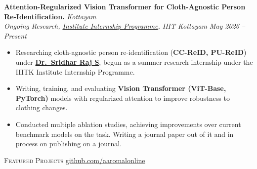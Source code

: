 \documentclass[a4paper]{article}
\newcommand{\lineunder} {
    \vspace*{-8pt} \\
    \hspace*{-18pt} \hrulefill \\
}
\begin{document}
\textbf{Attention-Regularized Vision Transformer for Cloth-Agnostic Person Re-Identification.} \hfill \textit{Kottayam} \\
\textit{Ongoing Research, \href{https://internship.iiitkottayam.ac.in/}{Institute Internship Programme}, IIIT Kottayam} \hfill \textit{May 2026 -- Present}
\begin{itemize} \itemsep 1pt
    \item Researching cloth-agnostic person re-identification (\textbf{CC-ReID, PU-ReID}) under \textbf{\href{https://scholar.google.com/citations?user=dGwfp0wAAAAJ&hl=en}{Dr.\ Sridhar Raj S}}, begun as a summer research internship under the IIITK Institute Internship Programme.
    \item Writing, training, and evaluating \textbf{Vision Transformer (ViT-Base, PyTorch)} models with regularized attention to improve robustness to clothing changes.
    \item Conducted multiple ablation studies, achieving improvements over current benchmark models on the task. Writing a journal paper out of it and in process on publishing on a journal.
\end{itemize}
\vspace*{2mm}

{\hspace*{-18pt}\vspace*{6pt} \textsc{Featured Projects} \hfill \href{https://github.com/aaromalonline}{github.com/aaromalonline}}
\vspace*{-6pt} \lineunder
\end{document}
